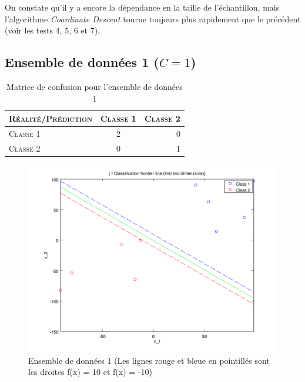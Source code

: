 \documentclass{article}
\begin{document}
On constate qu'il y a encore la dépendance en la taille de l'échantillon, mais l'algorithme \emph{Coordinate Descent} tourne toujours plus rapidement que le précédent (voir les tests 4, 5, 6 et 7).

\subsection{Ensemble de données 1 ($C = 1$)}

     \begin{table}[H]
       \caption{Matrice de confusion pour l'ensemble de données 1}
       \begin{tabular}{|l|c|r|}
         \hline
         \textsc{Réalité/Prédiction} & \textsc{Classe 1} & \textsc{Classe 2}\\
         \hline
         \textsc{Classe 1} & 2 & 0\\
         \hline
         \textsc{Classe 2} & 0 & 1\\
         \hline
       \end{tabular}
     \end{table}

         \begin{figure}[H]
           \begin{center}
             \includegraphics[scale=0.5]{images/line11.png}
             \caption{Ensemble de données 1 (Les lignes rouge et bleue en pointillés sont les droites f(x) = 10 et f(x) = -10)}
           \end{center}
         \end{figure}
\end{document}
